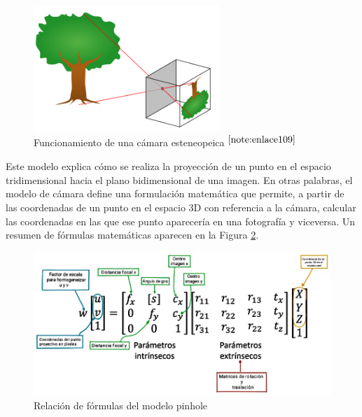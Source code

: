  \begin{figure} [h!]
	\begin{center}
		\includegraphics[width=7cm]{figs/cap6/pinhole.png}
	\end{center}
	\caption{Funcionamiento de una cámara esteneopeica $^{\ref{note:enlace109}}$}
	\label{fig:pinhole}
\end{figure}

\setcounter{footnote}{109} %


Este modelo explica cómo se realiza la proyección de un punto en el espacio tridimensional hacia el plano bidimensional de una imagen. En otras palabras, el modelo de cámara define una formulación matemática que permite, a partir de las coordenadas de un punto en el espacio 3D con referencia a la cámara, calcular las coordenadas en las que ese punto aparecería en una fotografía y viceversa. Un resumen de fórmulas matemáticas aparecen en la Figura \ref{fig:pinholeformula}.

 \begin{figure} [h!]
	\begin{center}
		\includegraphics[width=15cm]{figs/cap6/esquema_pinhole_matrices.jpg}
	\end{center}
	\caption{Relación de fórmulas del modelo pinhole}
	\label{fig:pinholeformula}
\end{figure}
  
